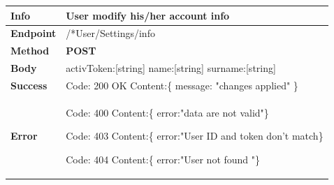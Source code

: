 \begin{table}[H]
\begin{tabular}{|l|p{}|}
\hline
\textbf{Info}             & User modify his/her account info                                                                      \\ \hline
\textbf{Endpoint}    &  /*User/Settings/info\\ \hline
\textbf{Method}         &   \textbf{POST}                                                                            \\ \hline

\textbf{Body}  &     activToken:[string] \newline
                   name:[string]\newline
                   surname:[string]\newline
              
                    \\ \hline
                    
\textbf{Success} &  Code: 200 OK \newline
                    Content:\{\newline 
                    message: "changes applied"\newline 
                    \}\\ \hline
\textbf{Error} &  Code: 400 \newline
                  Content:\{\newline
                  error:"data are not valid"\newline\}\newline
                  
                  Code: 403 \newline
                  Content:\{\newline
                  error:"User ID and token don't match\newline\}\newline
                  
                  Code: 404 \newline
                  Content:\{\newline
                  error:"User not found "\newline\}\\\hline

\end{tabular}
\end{table}




